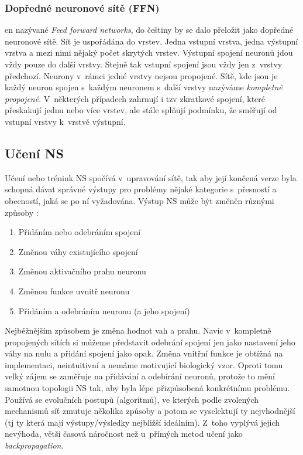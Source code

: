 \documentclass[12pt]{report}			%
\begin{document}
	\subsubsection{Dopředné neuronové sítě (\gls{FFN})}
	\label{sec:NN-FFN} 
	\Gls{en} nazývané \emph{Feed forward networks}, do češtiny by se dalo přeložit jako dopředné neuronové sítě. Síť je uspořádána do vrstev. Jedna vstupní vrstva, jedna výstupní vrstva a mezi nimi nějaký počet skrytých vrstev. Výstupní spojení neuronů jdou vždy pouze do další vrstvy. Stejně tak vstupní spojení jsou vždy jen z~vrstvy předchozí. Neurony v~rámci jedné vrstvy nejsou propojené. Sítě, kde jsou je každý neuron spojen s~každým neuronem s~další vrstvy nazýváme \emph{kompletně propojené}. V~některých případech zahrnují i \gls{tzv} zkratkové spojení, které přeskakují jednu nebo více vrstev, ale stále splňují podmínku, že směřují od vstupní vrstvy k~vrstvě výstupní. \parencite[\gls{str} 39-40]{NN_introduction-Kriessel}\\
	
	\subsection{Učení \gls{NS}}
	Učení nebo trénink \gls{NS} spočívá v~upravování sítě, tak aby její končená verze byla schopná dávat správné výstupy pro problémy nějaké kategorie s~přesností a obecností, jaká se po ní vyžadována. Výstup \gls{NS} může být změněn různými způsoby \parencite[\gls{s} 51]{NN_introduction-Kriessel}:
	\begin{enumerate}
	\item{Přidáním nebo odebráním spojení}
	\item{Změnou váhy existujícího spojení}
	\item{Změnou aktivačního prahu neuronu}
	\item{Změnou funkce uvnitř neuronu}
	\item{Přidáním a odebráním neuronu (a jeho spojení)}
	\end{enumerate}
	Nejběžnějším způsobem je změna hodnot vah a prahu. Navíc v~kompletně propojených sítích si můžeme představit odebrání spojení jen jako nastavení jeho váhy na nulu a přidání spojení jako opak. Změna vnitřní funkce je obtížná na implementaci, neintuitivní a nemáme motivující biologický vzor. Oproti tomu velký zájem se zaměřuje na přidávání a odebírání neuronů, protože to mění samotnou topologii \gls{NS} tak, aby byla lépe přizpůsobená konkrétnímu problému. Používá se evolučních postupů (algoritmů), ve kterých podle zvolených mechanismů síť zmutuje několika způsoby a potom se vyselektují ty nejvhodnější (\gls{tj} ty která mají výstupy/výsledky nejbližší ideálním). Z~toho vyplývá jejich nevýhoda, větší časová náročnost než u~přímých metod učení jako \emph{backpropagation}. \parencite[\gls{s} 52,127]{NN_introduction-Kriessel}\\
	
\end{document}
